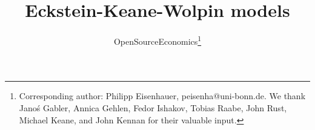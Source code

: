 
\title{Eckstein-Keane-Wolpin models}
\author{OpenSourceEconomics\thanks{Corresponding author: Philipp Eisenhauer, peisenha@uni-bonn.de. We thank  Jano\'s Gabler, Annica Gehlen, Fedor Ishakov, Tobias Raabe, John Rust, Michael Keane, and John Kennan for their valuable input.}}
\date{}
